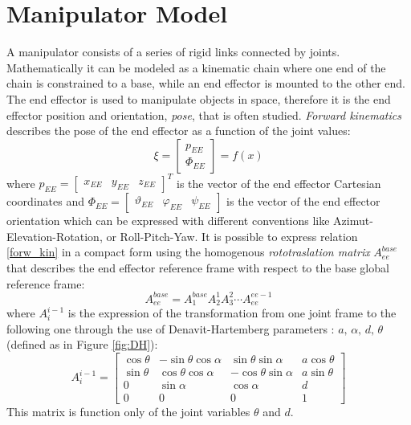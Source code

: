 \section{Manipulator Model}
A manipulator consists of a series of rigid links connected by joints. Mathematically it can be modeled as a kinematic chain where one end of the chain is constrained to a base, while an end effector is mounted to the other end. The end effector is used to manipulate objects in space, therefore it is the end effector position and orientation, \textit{pose}, that is often studied. \textit{Forward kinematics} describes the pose of the end effector as a function of the joint values:
\begin{equation}\label{forw_kin}
 	\xi=\left[\begin{matrix}p_{EE}\\\Phi_{EE}\end{matrix}\right]=f(x)
\end{equation} 
where $p_{EE}=\left[\begin{matrix}x_{EE}&y_{EE}&z_{EE}\end{matrix}\right]^T$ is the vector of the end effector Cartesian coordinates and $\Phi_{EE} =\left[\begin{matrix}\vartheta_{EE}&\varphi_{EE}&\psi_{EE}\end{matrix}\right]$ is the vector of the end effector orientation which can be expressed with different conventions like Azimut-Elevation-Rotation, or Roll-Pitch-Yaw. 
It is possible to express relation \eqref{forw_kin} in a compact form using the homogenous \textit{rototraslation matrix} $A_{ee}^{base}$ that describes the end effector reference frame with respect to the base global reference frame:
\begin{equation}\label{AAAA_man}
A_{ee}^{base}=A_1^{base}A_2^1A_3^2\cdots A_{ee}^{ee-1}
\end{equation}
where $A_i^{i-1}$ is the expression of the transformation from one joint frame to the following one through the use of Denavit-Hartemberg parameters \cite{DH}: $a\text{, }\alpha\text{, }d\text{, }\theta$ (defined as in Figure \ref{fig:DH}):
\begin{equation}
A_i^{i-1}=\left[
\begin{matrix}
\cos\theta & -\sin\theta\cos\alpha & \sin\theta\sin\alpha & a\cos\theta \\
\sin\theta & \cos\theta\cos\alpha & -\cos\theta\sin\alpha & a\sin\theta \\
0 & \sin\alpha & \cos\alpha & d \\
0 & 0 & 0 & 1
\end{matrix}
\right]
\end{equation}
This matrix is function only of the joint variables $\theta$ and $d$.

